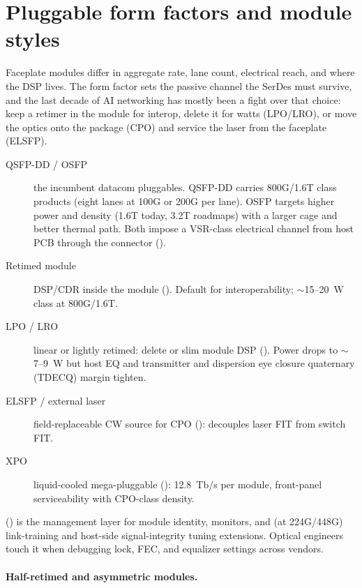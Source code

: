 \section{Pluggable form factors and module styles}
\label{sec:pluggables}

Faceplate modules differ in aggregate rate, lane count, electrical reach, and
where the DSP lives. The form factor sets the passive channel the SerDes must
survive, and the last decade of AI networking has mostly been a fight over that
choice: keep a retimer in the module for interop, delete it for watts (LPO/LRO),
or move the optics onto the package (CPO) and service the laser from the
faceplate (ELSFP).

\begin{description}
\item[QSFP-DD / OSFP] the incumbent datacom pluggables. QSFP-DD carries 800G/1.6T
      class products (eight lanes at 100G or 200G per lane). OSFP targets higher
      power and density (1.6T today, 3.2T roadmaps) with a larger cage and better
      thermal path. Both impose a VSR-class electrical channel from host PCB through
      the connector ().
\item[Retimed module] DSP/CDR inside the module (). Default
      for interoperability; $\sim$15--20~W class at 800G/1.6T.
\item[LPO / LRO] linear or lightly retimed: delete or slim module DSP
      (). Power drops to $\sim$7--9~W but host
      EQ and transmitter and dispersion eye closure quaternary (TDECQ) margin
      tighten.
\item[ELSFP / external laser] field-replaceable CW source for CPO
      (): decouples laser FIT from switch FIT.
\item[XPO] liquid-cooled mega-pluggable (): 12.8~Tb/s per module,
      front-panel serviceability with CPO-class density.
\end{description}

 () is the management layer for module identity, monitors,
and (at 224G/448G) link-training and host-side signal-integrity tuning extensions.
Optical engineers touch it when debugging lock, FEC, and equalizer settings across
vendors.

\paragraph{Half-retimed and asymmetric modules.}
\label{sec:module-styles}

